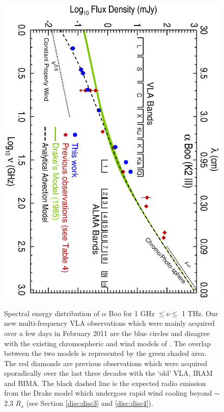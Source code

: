 \documentclass[iop]{emulateapj}
\begin{document}
\begin{figure}
\centering
\includegraphics[trim = 0mm 0mm 0mm 0mm, clip,scale=0.62, angle=90]{fig0.ps}
\\
\caption{Spectral energy distribution of $\alpha$ Boo for 1 GHz $\leq \nu \leq$ 1 THz. Our new multi-frequency VLA observations which were mainly acquired over a few days in February 2011 are the blue circles and disagree with the existing chromospheric and wind models of \cite{1985pssl.proc..351D}. The overlap between the two models is represented by the green shaded area. The red diamonds are previous observations which were acquired sporadically over the last three decades with the `old' VLA, IRAM and BIMA. The black dashed line is the expected radio emission from the Drake model which undergoes rapid wind cooling beyond $\sim$2.3 $R_{\star}$ (see Section \ref{disc:disc3} and \ref{disc:disc4}).}
\label{fig:fig1}
\centering

\end{figure}
\end{document}
